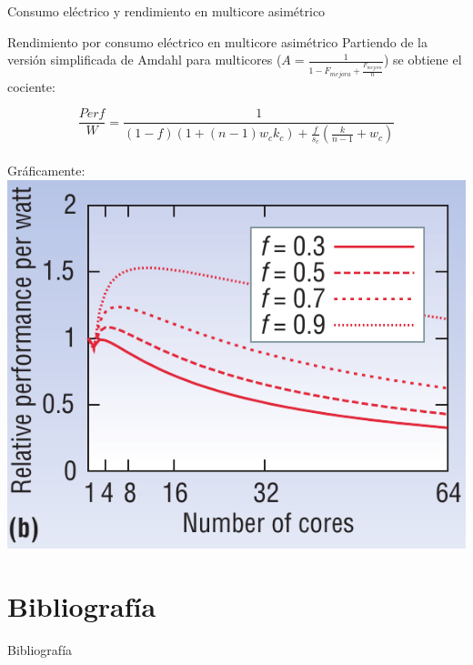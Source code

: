 \documentclass[utf8]{beamer}
\begin{document}
\begin{frame}{Consumo eléctrico y rendimiento en multicore asimétrico}
    \begin{block}{Rendimiento por consumo eléctrico en multicore asimétrico}
    Partiendo de la versión simplificada de Amdahl para multicores ($ A = \frac{1}{1 - F_{mejora} + \frac{F_{mejora}}{n}} $) se obtiene el cociente:
    
        $$ \frac{Perf}{W} = \frac{1}{(1-f)(1+(n-1)w_{c}k_{c}) + \frac{f}{s_{c}} (\frac{k}{n-1} + w_{c})} $$
    \\
    Gráficamente:    
    \\
    \center\includegraphics[width=.3\linewidth]{figures/am_powperf_c}
    
    \end{block}    
    
\end{frame}




\section{Bibliografía}

\begin{frame}[allowframebreaks]{Bibliografía}
    \nocite{*}
    
    
\end{frame}
\end{document}
